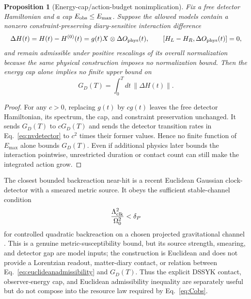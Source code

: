 \documentclass[11pt]{article}
\newtheorem{proposition}{Proposition}
\begin{document}
\begin{proposition}[Energy-cap/action-budget nonimplication]
\label{prop:energycap}
Fix a free detector Hamiltonian and a cap
$E_{\rm obs}\leq E_{\max}$.  Suppose the allowed models contain a nonzero
constraint-preserving diary-sensitive interaction difference
\begin{equation}
 \Delta H(t)=H(t)-H^{(0)}(t)
 =g(t)X\otimes\Delta O_{\rm phys}(t),
 \qquad [H_L-H_R,\Delta O_{\rm phys}(t)]=0,
 \label{eq:resourceinteraction}
\end{equation}
and remain admissible under positive rescalings of its overall normalization
because the same physical construction imposes no normalization bound.
Then the energy cap alone implies no finite upper bound on
\begin{equation}
 G_D(T)=\int_0^Tdt\,\|\Delta H(t)\|.
 \label{eq:GDcap}
\end{equation}
\end{proposition}

\begin{proof}
For any $c>0$, replacing $g(t)$ by $cg(t)$ leaves the free detector
Hamiltonian, its spectrum, the cap, and constraint preservation unchanged.
It sends $G_D(T)$ to $cG_D(T)$ and sends the detector transition rates in
Eq.~\eqref{eq:nvdetector} to $c^2$ times their former values.  Hence no finite
function of $E_{\max}$ alone bounds $G_D(T)$.  Even if additional physics
later bounds the interaction pointwise, unrestricted duration or contact
count can still make the integrated action grow.
\end{proof}

The closest bounded backreaction near-hit is a recent Euclidean Gaussian
clock-detector with a smeared metric source.  It obeys the sufficient
stable-channel condition
\begin{equation}
 \frac{\Lambda_{\rm clk}^2}{\Omega_0^2}<\delta_P
 \label{eq:euclideanadmissibility}
\end{equation}
for controlled quadratic backreaction on a chosen projected gravitational
channel \citep{EspindolaAli2026}.  This is a genuine metric-susceptibility
bound, but its source strength, smearing, and detector gap are model inputs;
the construction is Euclidean and does not provide a Lorentzian readout,
matter-diary contact, or relation between
Eq.~\eqref{eq:euclideanadmissibility} and $G_D(T)$.  Thus the explicit DSSYK
contact, observer-energy cap, and Euclidean admissibility inequality are
separately useful but do not compose into the resource law required by
Eq.~\eqref{eq:Cobs}.
\end{document}
